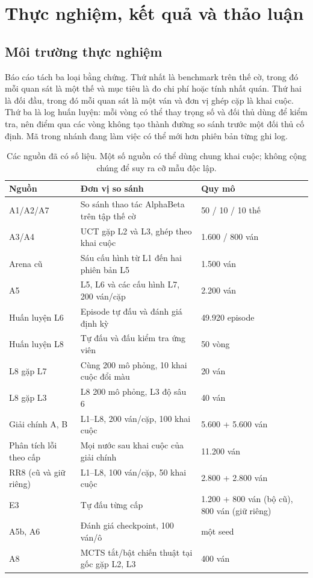 \chapter{Thực nghiệm, kết quả và thảo luận}
\label{ch:thuc-nghiem}

\section{Môi trường thực nghiệm}
Báo cáo tách ba loại bằng chứng. Thứ nhất là benchmark trên thế cờ, trong đó mỗi quan sát là một thế và mục tiêu là đo chi phí hoặc tính nhất quán. Thứ hai là đối đầu, trong đó mỗi quan sát là một ván và đơn vị ghép cặp là khai cuộc. Thứ ba là log huấn luyện: mỗi vòng có thể thay trọng số và đối thủ dùng để kiểm tra, nên điểm qua các vòng không tạo thành đường so sánh trước một đối thủ cố định. Mã trong nhánh đang làm việc có thể mới hơn phiên bản từng ghi log.

\begin{table}[H]
\centering\small
\begin{tabularx}{\textwidth}{@{}lXl@{}}
\toprule
Nguồn & Đơn vị so sánh & Quy mô \\
\midrule
A1/A2/A7 & So sánh thao tác AlphaBeta trên tập thế cờ & 50 / 10 / 10 thế \\
A3/A4 & UCT gặp L2 và L3, ghép theo khai cuộc & 1.600 / 800 ván \\
Arena cũ & Sáu cấu hình từ L1 đến hai phiên bản L5 & 1.500 ván \\
A5 & L5, L6 và các cấu hình L7, 200 ván/cặp & 2.200 ván \\
Huấn luyện L6 & Episode tự đấu và đánh giá định kỳ & 49.920 episode \\
Huấn luyện L8 & Tự đấu và đấu kiểm tra ứng viên & 50 vòng \\
L8 gặp L7 & Cùng 200 mô phỏng, 10 khai cuộc đổi màu & 20 ván \\
L8 gặp L3 & L8 200 mô phỏng, L3 độ sâu 6 & 40 ván \\
Giải chính A, B & L1--L8, 200 ván/cặp, 100 khai cuộc & 5.600 + 5.600 ván \\
Phân tích lỗi theo cấp & Mọi nước sau khai cuộc của giải chính & 11.200 ván \\
RR8 (cũ và giữ riêng) & L1--L8, 100 ván/cặp, 50 khai cuộc & 2.800 + 2.800 ván \\
E3 & Tự đấu từng cấp & 1.200 + 800 ván (bộ cũ), 800 ván (giữ riêng) \\
A5b, A6 & Đánh giá checkpoint, 100 ván/ô & một seed \\
A8 & MCTS tắt/bật chiến thuật tại gốc gặp L2, L3 & 400 ván \\
\bottomrule
\end{tabularx}
\caption{Các nguồn đã có số liệu. Một số nguồn có thể dùng chung khai cuộc; không cộng chúng để suy ra cỡ mẫu độc lập.}
\end{table}

